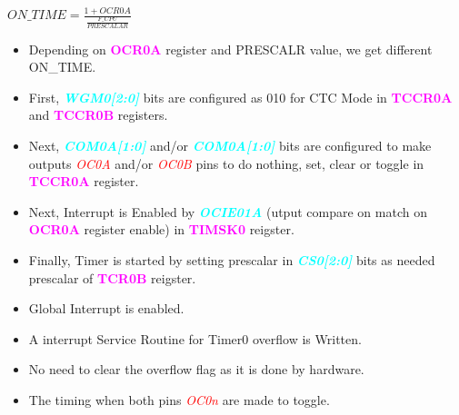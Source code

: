 \documentclass{article}
\newcommand{\bitFormat}[1]{\emph{\textbf{\textcolor{cyan}{#1}}}}
\newcommand{\regFormat}[1]{\textbf{\textcolor{magenta}{#1}}}
\newcommand{\pinFormat}[1]{\emph{\textcolor{red}{#1}}}
\begin{document}
\begin{center}
    $ON\_TIME = \frac{1 + OCR0A}{\frac{F\_CPU}{PRESCALAR}}$
\end{center}
\begin{itemize}
    \item Depending on \regFormat{OCR0A} register and PRESCALR value, we get different ON\_TIME.
    \item First, \bitFormat{WGM0[2:0]} bits are configured as 010 for CTC Mode in \regFormat{TCCR0A} and \regFormat{TCCR0B} registers.
    \item Next, \bitFormat{COM0A[1:0]} and/or \bitFormat{COM0A[1:0]} bits are configured to make outputs \pinFormat{OC0A} and/or \pinFormat{OC0B} pins to do nothing, set, clear or toggle in \regFormat{TCCR0A} register.
    \item Next, Interrupt is Enabled by \bitFormat{OCIE01A} (utput compare on match on \regFormat{OCR0A} register enable) in \regFormat{TIMSK0} reigster.
    \item Finally, Timer is started by setting prescalar in \bitFormat{CS0[2:0]} bits as needed prescalar of \regFormat{TCR0B} reigster.
    \item Global Interrupt is enabled.
    \item A interrupt Service Routine for Timer0 overflow is Written.
    \item No need to clear the overflow flag as it is done by hardware.
    \item The timing when both pins \pinFormat{OC0n} are made to toggle.
\end{itemize}
\end{document}
